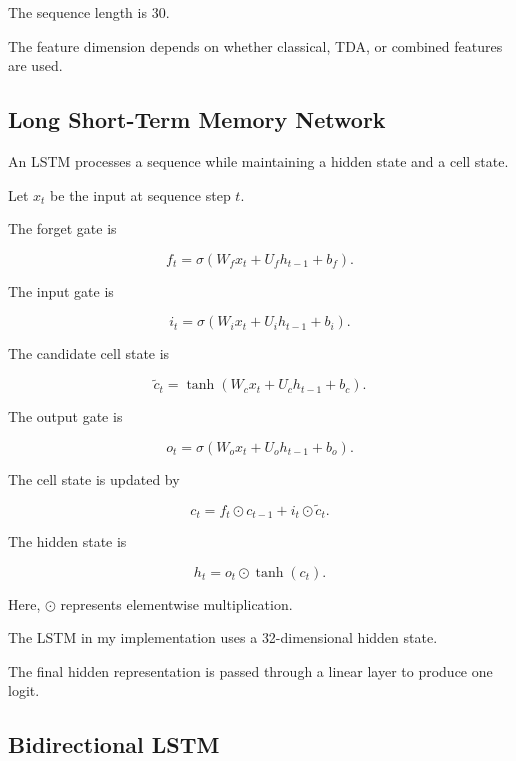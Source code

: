 \documentclass[oneside,english,11pt]{article}
\renewcommand{\boxed}[1]{#1}
\begin{document}
The sequence length is 30.

The feature dimension depends on whether
classical, TDA, or combined features are used.

\subsection{Long Short-Term Memory Network}

An LSTM processes a sequence while maintaining
a hidden state and a cell state.

Let $x_t$ be the input at sequence step $t$.

The forget gate is

\begin{equation}
\boxed{
f_t=
\sigma(W_fx_t+U_fh_{t-1}+b_f).
}
\end{equation}

The input gate is

\begin{equation}
\boxed{
i_t=
\sigma(W_ix_t+U_ih_{t-1}+b_i).
}
\end{equation}

The candidate cell state is

\begin{equation}
\boxed{
\widetilde{c}_t
=
\tanh(W_cx_t+U_ch_{t-1}+b_c).
}
\end{equation}

The output gate is

\begin{equation}
\boxed{
o_t=
\sigma(W_ox_t+U_oh_{t-1}+b_o).
}
\end{equation}

The cell state is updated by

\begin{equation}
\boxed{
c_t=
f_t\odot c_{t-1}
+
i_t\odot\widetilde{c}_t.
}
\end{equation}

The hidden state is

\begin{equation}
\boxed{
h_t=
o_t\odot\tanh(c_t).
}
\end{equation}

Here, $\odot$ represents elementwise multiplication.

The LSTM in my implementation uses a
32-dimensional hidden state.

The final hidden representation is passed
through a linear layer to produce one logit.

\subsection{Bidirectional LSTM}
\end{document}
